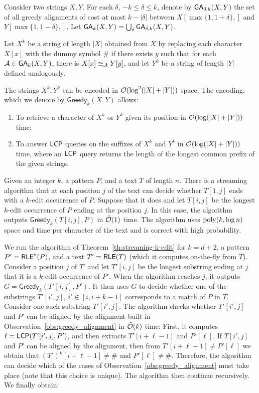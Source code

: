\documentclass{article}
\begin{document}
Consider two strings $X, Y$. For each $\delta$, $-k \le \delta \le k$, denote by $\mathsf{GA}_{\delta, k}(X, Y)$ the set of all greedy alignments of cost at most $k-|\delta|$ between $X[\max\{1,1 +\delta\} , ]$ and $Y[\max\{1,1-\delta\}, ]$. Let $\mathsf{GA}_k(X, Y) = \bigcup_\delta \mathsf{GA}_{\delta, k}(X,Y)$. 

Let $X^k$ be a string of length $|X|$ obtained from $X$ by replacing each character $X[x]$ with the dummy symbol $\#$ if there exists $y$ such that for each $\mathcal{A} \in \mathsf{GA}_k(X, Y)$, there is $X[x] \simeq_{\mathcal{A}} Y[y]$, and let $Y^k$ be a string of length $|Y|$ defined analogously. 

\begin{fact}
The strings $X^k, Y^k$ can be encoded in $\mathcal{O}(\log^2 (|X|+|Y|))$ space. 
The encoding, which we denote by $\mathsf{Greedy}_k(X, Y)$ allows:
\begin{enumerate}
\item To retrieve a character of $X^k$ or $Y^k$ given its position in $\mathcal{O}(\log (|X| + |Y|))$ time;
\item To answer $\textsf{LCP}$ queries on the suffixes of $X^k$ and $Y^k$ in $\mathcal{O}(\log (|X| + |Y|))$ time, where an $\textsf{LCP}$ query returns the length of the longest common prefix of the given strings.
\end{enumerate}
\end{fact}

\begin{theorem}\label{th:streaming-k-edit}
Given an integer $k$, a pattern $P$, and a text $T$ of length $n$.
There is a streaming algorithm that at each position $j$ of the text can decide whether $T[1,j]$ ends with a $k$-edit occurrence of $P$. Suppose that it does and let $T[i,j]$ be the longest $k$-edit occurrence of $P$ ending at the position $j$. In this case, the algorithm outputs $\mathsf{Greedy}_k(T[i,j], P)$ in $\tilde{\mathcal{O}}(1)$ time. The algorithm uses $\mathrm{poly}(k, \log n)$ space and time per character of the text and is correct with high probability. 
\end{theorem} 

We run the algorithm of Theorem~\ref{th:streaming-k-edit} for $k = d+2$, a pattern $P' = \textsf{RLE}^\ast(P)$, and a text $T' = \textsf{RLE}(T)$ (which it computes on-the-fly from $T$). Consider a position $j$ of $T$' and let $T'[i,j]$ be the longest substring ending at $j$ that it is a $k$-edit occurrence of $P'$. When the algorithm reaches $j$, it outputs $G = \mathsf{Greedy}_k(T'[i,j], P')$. It then uses $G$ to decide whether one of the substrings $T'[i',j]$, $i' \in [i, i+k-1]$ corresponds to a match of $P$ in $T$. Consider one such substring $T'[i',j]$. The algorithm checks whether $T'[i',j]$ and $P'$ can be aligned by the alignment built in Observation~\ref{obs:greedy_alignment} in $\tilde{\mathcal{O}}(k)$ time: First, it computes $\ell = \textsf{LCP}(T'[i',j], P')$, and then extracts $T'[i+\ell-1]$ and $P'[\ell]$. If $T[i',j]$ and $P'$ can be aligned by the alignment, then from $T'[i+\ell-1] \neq P'[\ell]$ we obtain that $(T')^k[i+\ell-1] \neq \#$ and $P'[\ell] \neq \#$. Therefore, the algorithm can decide which of the cases of Observation~\ref{obs:greedy_alignment} must take place (note that this choice is unique). The algorithm then continue recursively. We finally obtain:
\end{document}
